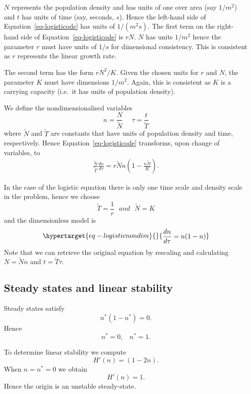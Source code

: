 \documentclass[
  letterpaper,
  DIV=11,
  numbers=noendperiod]{scrreprt}
\begin{document}
\(N\) represents the population density and has units of one over area
(say \(1/m^2\)) and \(t\) has units of time (say, seconds, \(s\)). Hence
the left-hand side of Equation~\ref{eq-logisticode} has units of
\(1/(m^2 s)\). The first term on the right-hand side of
Equation~\ref{eq-logisticode} is \(rN\). \(N\) has units \(1/m^2\) hence
the parameter \(r\) must have units of \(1/s\) for dimensional
consistency. This is consistent as \(r\) represents the linear growth
rate.

The second term has the form \(rN^2/K\). Given the chosen units for
\(r\) and \(N\), the parameter \(K\) must have dimensions \(1/m^2\).
Again, this is consistent as \(K\) is a carrying capacity (i.e.~it has
units of population density).

We define the nondimensionalised variables \[
n=\frac{N}{\tilde{N}} \ \ \ \ \ \ \tau=\frac{t}{\tilde{T}}
\] where \(\tilde{N}\) and \(\tilde{T}\) are constants that have units
of population density and time, respectively. Hence
Equation~\ref{eq-logisticode} transforms, upon change of variables, to
\[
\begin{aligned}
\frac{\tilde{N}}{\tilde{T} }\frac{dn}{d\tau}=r\tilde{N}n(1-\frac{n\tilde{N}}{K}).
\end{aligned}
\]

In the case of the logistic equation there is only one time scale and
density scale in the problem, hence we choose \[
\tilde{T}=\frac{1}{r}  \ \ \ and \ \ \ \tilde{N}=K
\] and the dimensionless model is
\begin{equation}\protect\hypertarget{eq-logisticnondim}{}{
\begin{aligned}
\frac{dn}{d\tau}= n(1-n)
\end{aligned}
}\label{eq-logisticnondim}\end{equation} Note that we can retrieve the
original equation by rescaling and calculating \(N=\tilde{N}n\) and
\(t=\tilde{T}\tau\).

\hypertarget{steady-states-and-linear-stability}{%
\subsection{Steady states and linear
stability}\label{steady-states-and-linear-stability}}

Steady states satisfy \[
n^*(1-n^*)=0.
\] Hence \[
n^*=0, \ \ \ \ n^*=1.
\]

To determine linear stability we compute \[
H'(n)= (1-2n).
\] When \(n=n^*=0\) we obtain \[
H'(n)= 1.
\] Hence the origin is an unstable steady-state.
\end{document}
